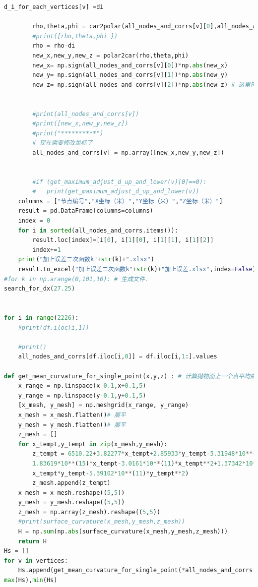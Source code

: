 \documentclass[withoutpreface,bwprint]{cumcmthesis} %
\begin{document}
\begin{appendices}
\begin{lstlisting}[language=python]
        d_i_for_each_vertices[v] =di 
        
        rho,theta,phi = car2polar(all_nodes_and_corrs[v][0],all_nodes_and_corrs[v][1],all_nodes_and_corrs[v][2])
        #print([rho,theta,phi ])
        rho = rho-di
        new_x,new_y,new_z = polar2car(rho,theta,phi)
        new_x= np.sign(all_nodes_and_corrs[v][0])*np.abs(new_x)
        new_y= np.sign(all_nodes_and_corrs[v][1])*np.abs(new_y)
        new_z= np.sign(all_nodes_and_corrs[v][2])*np.abs(new_z) # 这里符号计算有点问题，但是小幅度的转换并不会影响到角度
        
        
        #print(all_nodes_and_corrs[v])
        #print([new_x,new_y,new_z])
        #print("**********")
        # 现在需要修改坐标了
        all_nodes_and_corrs[v] = np.array([new_x,new_y,new_z])
        
        
        #if (get_maximum_adjust_d_up_and_lower(v)[0]==0):
        #   print(get_maximum_adjust_d_up_and_lower(v))
    columns = ["节点编号","X坐标（米）","Y坐标（米）","Z坐标（米）"]
    result = pd.DataFrame(columns=columns)
    index = 0
    for i in sorted(all_nodes_and_corrs.items()):
        result.loc[index]=[i[0], i[1][0], i[1][1], i[1][2]]  
        index+=1
    print("加上误差二次函数k"+str(k)+".xlsx")
    result.to_excel("加上误差二次函数k"+str(k)+"加上误差.xlsx",index=False)
#for k in np.arange(0,101,10): # 生成文件.
search_for_dx(27.25)


for i in range(2226):
    #print(df.iloc[i,1])

    #print()
    all_nodes_and_corrs[df.iloc[i,0]] = df.iloc[i,1:].values

def get_mean_curvature_for_single_point(x,y,z) : # 计算抛物面上一个点平均曲率
    x_range = np.linspace(x-0.1,x+0.1,5)
    y_range = np.linspace(y-0.1,y+0.1,5)
    [x_mesh, y_mesh] = np.meshgrid(x_range, y_range)
    x_mesh = x_mesh.flatten()# 展平
    y_mesh = y_mesh.flatten()# 展平
    z_mesh = [] 
    for x_tempt,y_tempt in zip(x_mesh,y_mesh):
        z_tempt = 6510.22+3.82277*x_tempt+2.85933*y_tempt-5.31948*10**(-6)*np.sqrt(1.63902*10**(18)+
        1.83619*10**(15)*x_tempt-3.0161*10**(11)*x_tempt**2+1.37342*10**(15)*y_tempt+8.06466*10**(11)*
        x_tempt*y_tempt-5.39102*10**(11)*y_tempt**2)
        z_mesh.append(z_tempt)
    x_mesh = x_mesh.reshape((5,5))
    y_mesh = y_mesh.reshape((5,5))
    z_mesh = np.array(z_mesh).reshape((5,5))
    #print(surface_curvature(x_mesh,y_mesh,z_mesh))
    H = np.sum(np.abs(surface_curvature(x_mesh,y_mesh,z_mesh)))
    return H
Hs = []
for v in vertices:
    Hs.append(get_mean_curvature_for_single_point(*all_nodes_and_corrs[v]))
max(Hs),min(Hs)


\end{lstlisting}
\end{appendices}
\end{document}
